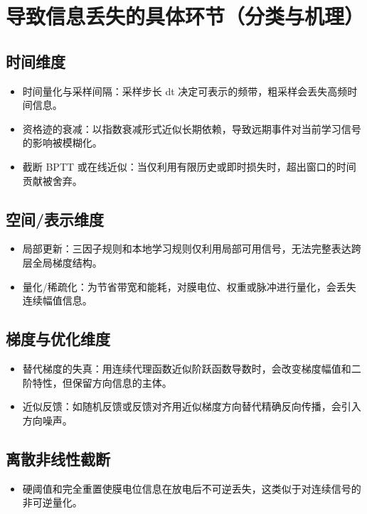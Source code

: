 \documentclass[journal,12pt,onecolumn]{IEEEtran}
\begin{document}
\section{导致信息丢失的具体环节（分类与机理）}
\subsection{时间维度}
\begin{itemize}
  \item 时间量化与采样间隔：采样步长 dt 决定可表示的频带，粗采样会丢失高频时间信息。\
  \item 资格迹的衰减：以指数衰减形式近似长期依赖，导致远期事件对当前学习信号的影响被模糊化。\
  \item 截断 BPTT 或在线近似：当仅利用有限历史或即时损失时，超出窗口的时间贡献被舍弃。
\end{itemize}

\subsection{空间/表示维度}
\begin{itemize}
  \item 局部更新：三因子规则和本地学习规则仅利用局部可用信号，无法完整表达跨层全局梯度结构。\
  \item 量化/稀疏化：为节省带宽和能耗，对膜电位、权重或脉冲进行量化，会丢失连续幅值信息。\
\end{itemize}

\subsection{梯度与优化维度}
\begin{itemize}
  \item 替代梯度的失真：用连续代理函数近似阶跃函数导数时，会改变梯度幅值和二阶特性，但保留方向信息的主体。\
  \item 近似反馈：如随机反馈或反馈对齐用近似梯度方向替代精确反向传播，会引入方向噪声。\
\end{itemize}

\subsection{离散非线性截断}
\begin{itemize}
  \item 硬阈值和完全重置使膜电位信息在放电后不可逆丢失，这类似于对连续信号的非可逆量化。\
\end{itemize}
\end{document}
